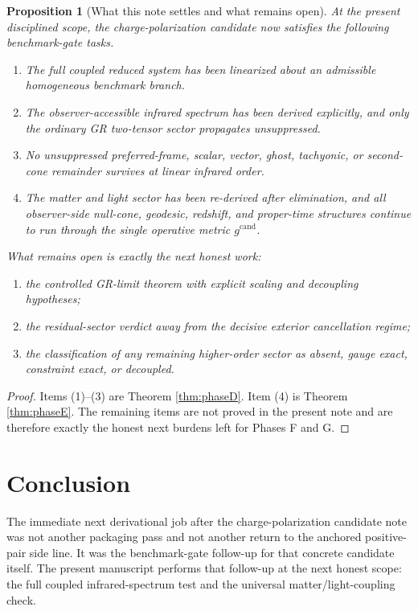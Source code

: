 \documentclass[11pt]{article}
\newcommand{\CandidateMetric}{g^{\mathrm{cand}}}
\newtheorem{proposition}{Proposition}
\begin{document}
\begin{proposition}[What this note settles and what remains open]
\label{prop:status}
At the present disciplined scope, the charge-polarization candidate now satisfies the following benchmark-gate tasks.
\begin{enumerate}
    \item The full coupled reduced system has been linearized about an admissible homogeneous benchmark branch.
    \item The observer-accessible infrared spectrum has been derived explicitly, and only the ordinary GR two-tensor sector propagates unsuppressed.
    \item No unsuppressed preferred-frame, scalar, vector, ghost, tachyonic, or second-cone remainder survives at linear infrared order.
    \item The matter and light sector has been re-derived after elimination, and all observer-side null-cone, geodesic, redshift, and proper-time structures continue to run through the single operative metric \(\CandidateMetric\).
\end{enumerate}
What remains open is exactly the next honest work:
\begin{enumerate}
    \item the controlled GR-limit theorem with explicit scaling and decoupling hypotheses;
    \item the residual-sector verdict away from the decisive exterior cancellation regime;
    \item the classification of any remaining higher-order sector as absent, gauge exact, constraint exact, or decoupled.
\end{enumerate}
\end{proposition}

\begin{proof}
Items (1)--(3) are Theorem \ref{thm:phaseD}. Item (4) is Theorem \ref{thm:phaseE}. The remaining items are not proved in the present note and are therefore exactly the honest next burdens left for Phases F and G.
\end{proof}

\section{Conclusion}

The immediate next derivational job after the charge-polarization candidate note was not another packaging pass and not another return to the anchored positive-pair side line. It was the benchmark-gate follow-up for that concrete candidate itself. The present manuscript performs that follow-up at the next honest scope: the full coupled infrared-spectrum test and the universal matter/light-coupling check.
\end{document}
